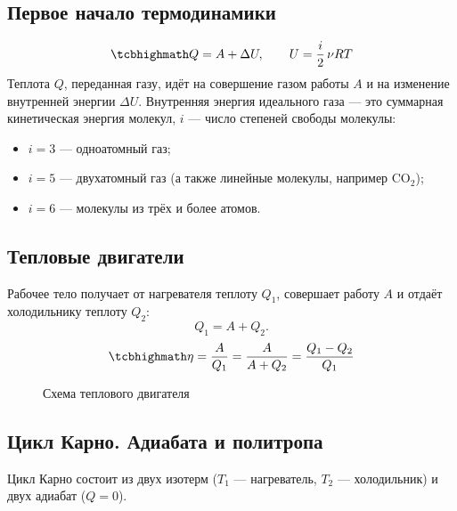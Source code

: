 \documentclass[11pt,a4paper]{article}
\begin{document}
\subsection{Первое начало термодинамики}
\[
\kbox{Q=A+\Delta U,\qquad U=\frac i2\,\nu RT}
\]
Теплота $Q$, переданная газу, идёт на совершение газом работы $A$ и на изменение внутренней энергии $\Delta U$.
Внутренняя энергия идеального газа — это суммарная кинетическая энергия молекул, $i$ — число степеней свободы молекулы:
\begin{itemize}
\item $i=3$ — одноатомный газ;
\item $i=5$ — двухатомный газ (а также линейные молекулы, например CO$_2$);
\item $i=6$ — молекулы из трёх и более атомов.
\end{itemize}

\subsection{Тепловые двигатели}
Рабочее тело получает от нагревателя теплоту $Q_1$, совершает работу $A$ и отдаёт холодильнику теплоту $Q_2$:
\[
Q_1=A+Q_2.
\]
\[
\kbox{\eta=\frac A{Q_1}=\frac A{A+Q_2}=\frac{Q_1-Q_2}{Q_1}}
\]

\begin{figure}[H]
\centering
{}
\caption{Схема теплового двигателя}
\end{figure}

\subsection{Цикл Карно. Адиабата и политропа}
Цикл Карно состоит из двух изотерм ($T_1$ — нагреватель, $T_2$ — холодильник) и двух адиабат ($Q=0$).
\end{document}

